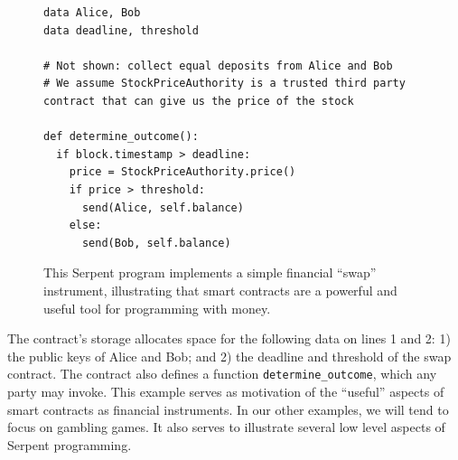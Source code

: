 \documentclass{llncs}
\begin{document}
\begin{figure}
\begin{mdframed}
\begin{verbatim}
data Alice, Bob
data deadline, threshold

# Not shown: collect equal deposits from Alice and Bob
# We assume StockPriceAuthority is a trusted third party contract that can give us the price of the stock

def determine_outcome():
  if block.timestamp > deadline: 
    price = StockPriceAuthority.price()
    if price > threshold:
      send(Alice, self.balance)
    else:
      send(Bob, self.balance)
\end{verbatim}
\end{mdframed}
\caption{This Serpent program implements a simple financial ``swap'' instrument, illustrating that smart contracts are a powerful and useful tool for programming with money.}
\end{figure}

The contract's storage 
allocates space for the following data on lines 1 and 2: 
1) the public keys of Alice and Bob;
and 2) the deadline and threshold 
of the swap contract.
The contract also defines 
a function \texttt{determine\_outcome}, which any party may invoke.
This example serves as motivation of the ``useful'' aspects of smart contracts as financial instruments. In our other examples, we will tend to focus on gambling games. It also serves to illustrate several low level aspects of Serpent programming.


%
%
%
\end{document}

